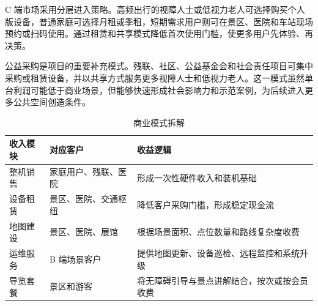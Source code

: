 \documentclass[a4paper,fontset=none]{ctexart}
\begin{document}
C 端市场采用分层进入策略。高频出行的视障人士或低视力老人可选择购买个人版设备，普通家庭可选择月租或季租，短期需求用户则可在景区、医院和车站现场预约或扫码使用。通过租赁和共享模式降低首次使用门槛，使更多用户先体验、再决策。

公益采购是项目的重要补充模式。残联、社区、公益基金会和社会责任项目可集中采购或租赁设备，并以共享方式服务更多视障人士和低视力老人。这一模式虽然单台利润可能低于商业场景，但能够快速形成社会影响力和示范案例，为后续进入更多公共空间创造条件。

\begin{longtable}{@{}>{\raggedright\arraybackslash}p{3cm} >{\raggedright\arraybackslash}p{3.5cm} >{\raggedright\arraybackslash}p{\dimexpr\textwidth-6.5cm-4\tabcolsep\relax}@{}}
  \caption{商业模式拆解}\\
  \toprule
    收入模块 & 对应客户 & 收益逻辑 \\
    \midrule
    整机销售 & 家庭用户、残联、医院 & 形成一次性硬件收入和装机基础 \\
    设备租赁 & 景区、医院、交通枢纽 & 降低客户采购门槛，形成稳定现金流 \\
    地图建设 & 景区、医院、展馆 & 根据场景面积、点位数量和路线复杂度收费 \\
    运维服务 & B 端场景客户 & 提供地图更新、设备巡检、远程监控和系统升级 \\
    导览套餐 & 景区和游客 & 将无障碍引导与景点讲解结合，按次或按会员收费 \\
    \bottomrule
\end{longtable}
\end{document}

